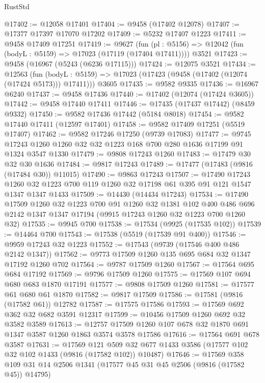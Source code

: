 \begin{lexlean}{RustStd}
\begin{coremodule}
@17402 := @12058 @17401
@17404 := @9458 (@17402 @12078)
@17407 := @17377 @17397 @17070 @17202
@17409 := @5232 @17407 @1223
@17411 := @9458 @17409 @17251
@17419 := @9627
    (fun (pl : @5156) => @12042 (fun (bodyL : @5159) => @17023 (@17119 (@17404 @17411))))
    @3521
@17423 := @9458 (@16967 (@5243 (@6236 @17115)))
@17424 := @12075 @3521
@17434 := @12563
    (fun (bodyL : @5159) => @17023 (@17423 (@9458 (@17402 (@12074 (@17424 @5173))) @17411)))
    @3605
@17435 := @9582 @9335
@17436 := @16967 @6240
@17437 := @9458 @17436
@17440 := @17402 (@12074 (@17424 @3605))
@17442 := @9458 @17440 @17411
@17446 := @17435 (@17437 @17442) (@8459 @9332)
@17450 := @9582 @17436 @17442 (@5184 @8018)
@17454 := @9582 @17440 @17411 (@12597 @17401)
@17458 := @9582 @17409 @17251 (@5519 @17407)
@17462 := @9582 @17246 @17250 (@9739 @17083)
@17477 := @9745 @17243 @1260 @1260 @32 @32 @1223 @168 @700 @280 @1636 @17199 @91 @1324 @3547 @1330
@17479 := @9808 @17243 @1260
@17483 := @17479 @30 @32 @30 @1636
@17484 := @9817 @17243
@17489 := @17477 (@17483 (@9816 (@17484 @30)) @11015)
@17490 := @9863 @17243
@17507 := @17490
    @17243
    @1260
    @32
    @1223
    @700
    @119
    @1260
    @32
    @17198
    @61
    @395
    @91
    @121
    @1547
    @1347
    @1347
    @1433
@17509 := @14430 (@14434 @17243)
@17534 := @17490
    @17509
    @1260
    @32
    @1223
    @700
    @91
    @1260
    @32
    @1381
    @102
    @400
    @486
    @696
    @2142
    @1347
    @1347
    @17194
    (@9915 @17243 @1260 @32 @1223 @700 @1260 @32)
@17535 := @9945 @700
@17538 := @17534 (@9925 (@17535 @102))
@17539 := @14464 @700
@17543 := @17538 (@5519 (@17539 @91 @400))
@17546 := @9959 @17243 @32 @1223
@17552 := @17543 (@9739 (@17546 @400 @486 @2142 @1347))
@17562 := @9773 @17509 @1260 @135 @695 @684 @32 @1347 @17192 @1260 @702
@17564 := @9787 @17509 @1260
@17567 := @17564 @695 @684 @17192
@17569 := @9796 @17509 @1260
@17575 := @17569 @107 @694 @680 @683 @1870 @17191
@17577 := @9808 @17509 @1260
@17581 := @17577 @61 @680 @61 @1870
@17582 := @9817 @17509
@17586 := @17581 (@9816 (@17582 @61)) @12782
@17587 := @17575 @17586
@17593 := @17569 @692 @362 @32 @682 @3591 @12317
@17599 := @10456 @17509 @1260 @692 @32 @3582 @3589
@17613 := @12757 @17509 @1260 @107 @678 @32 @1870 @691 @1347 @3587 @1260 @1863 @3574 @3578 @17586
@17616 := @17564 @691 @678 @3587
@17631 := @17569
    @121
    @509
    @32
    @677
    @1433
    @3586
    (@17577 @102 @32 @102 @1433 (@9816 (@17582 @102)) @10487)
@17646 := @17569
    @358
    @109
    @31
    @14
    @2506
    @1341
    (@17577 @45 @31 @45 @2506 (@9816 (@17582 @45)) @14795)

\end{coremodule}
\end{lexlean}
